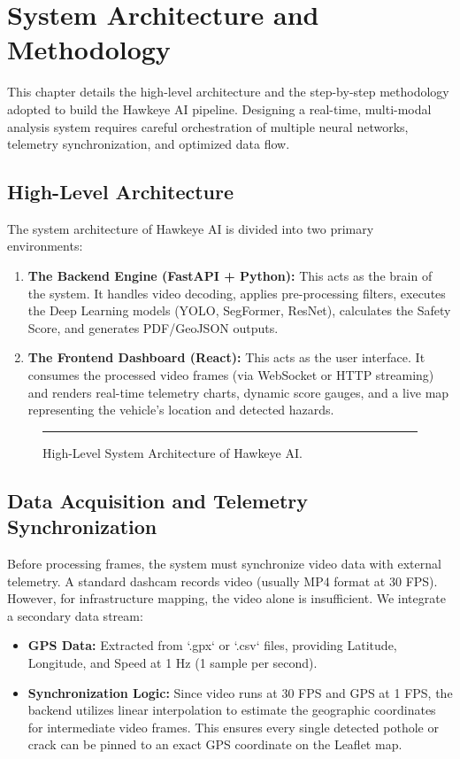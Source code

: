 \chapter{System Architecture and Methodology}
\label{chap:architecture}

This chapter details the high-level architecture and the step-by-step methodology adopted to build the Hawkeye AI pipeline. Designing a real-time, multi-modal analysis system requires careful orchestration of multiple neural networks, telemetry synchronization, and optimized data flow.

\section{High-Level Architecture}
The system architecture of Hawkeye AI is divided into two primary environments:
\begin{enumerate}
    \item \textbf{The Backend Engine (FastAPI + Python):} This acts as the brain of the system. It handles video decoding, applies pre-processing filters, executes the Deep Learning models (YOLO, SegFormer, ResNet), calculates the Safety Score, and generates PDF/GeoJSON outputs.
    \item \textbf{The Frontend Dashboard (React):} This acts as the user interface. It consumes the processed video frames (via WebSocket or HTTP streaming) and renders real-time telemetry charts, dynamic score gauges, and a live map representing the vehicle's location and detected hazards.
\end{enumerate}

\begin{figure}[H]
    \centering
    \rule{0.8\textwidth}{6cm} %
    \caption{High-Level System Architecture of Hawkeye AI.}
    \label{fig:arch}
\end{figure}

\section{Data Acquisition and Telemetry Synchronization}
Before processing frames, the system must synchronize video data with external telemetry. A standard dashcam records video (usually MP4 format at 30 FPS). However, for infrastructure mapping, the video alone is insufficient. We integrate a secondary data stream:
\begin{itemize}
    \item \textbf{GPS Data:} Extracted from `.gpx` or `.csv` files, providing Latitude, Longitude, and Speed at 1 Hz (1 sample per second).
    \item \textbf{Synchronization Logic:} Since video runs at 30 FPS and GPS at 1 FPS, the backend utilizes linear interpolation to estimate the geographic coordinates for intermediate video frames. This ensures every single detected pothole or crack can be pinned to an exact GPS coordinate on the Leaflet map.
\end{itemize}

